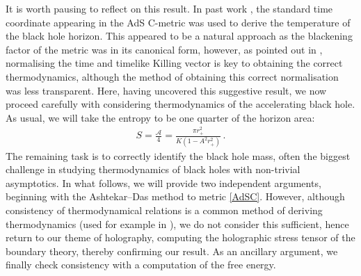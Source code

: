 \documentclass[
twoside,
openright,
frontopenright,
]{dmathesis}
\newcommand{\tcr}{\textcolor{red}}
\begin{document}
It is worth pausing to reflect on this result. In past work
\cite{Appels:2016uha,Appels:2017xoe,Gregory:2017ogk},
the standard time coordinate appearing in the AdS C-metric was used to derive
the temperature of the black hole horizon.
This appeared to
be a natural approach as the blackening factor of the metric was in its
canonical form, however, as pointed out in \cite{Gibbons:2004ai}, normalising the
time and timelike Killing vector is key to obtaining the correct
thermodynamics, although the method of obtaining this correct
normalisation was less transparent. Here, having uncovered this
suggestive result, we now proceed carefully with considering
thermodynamics of the accelerating black hole.
As usual, we will take the entropy to be one quarter of the horizon area:
\begin{align}
S=\frac{\mathcal{A}}{4}=\frac{\pi r_+^2}{K(1-A^2r_+^2)}\,.
\label{entropy}
\end{align}
The remaining task is to correctly identify the black hole mass, often the
biggest challenge in studying thermodynamics of black holes with non-trivial
asymptotics. In what follows, we will provide two independent arguments, %
beginning with the {Ashtekar--Das} method \cite{Ashtekar:1999jx,Das:2000cu} to metric
\eqref{AdSC}. However, although consistency
of thermodynamical relations is a common method of deriving
thermodynamics (used for {example in \cite{Astorino:2016ybm}}), we do not
consider this sufficient, hence return to our theme of holography,
computing the holographic stress tensor of the boundary
theory, thereby confirming our result.
As an ancillary argument, we finally check consistency with
a computation of the free energy.
\end{document}

